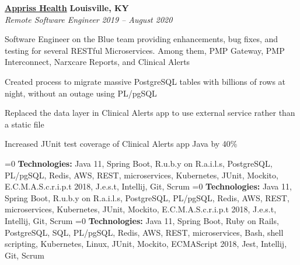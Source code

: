 %
    \headerrow
        {\textbf{\href{https://apprisshealth.com/}{Appriss Health}}}
        {\textbf{Louisville, KY}}
    \\
    \headerrow
        {\emph{Remote Software Engineer}}
        {\emph{2019 -- August 2020}}
    \begin{itemize*}
        \item Software Engineer on the Blue team providing enhancements, bug fixes, and testing for several RESTful Microservices.
            Among them, PMP Gateway, PMP Interconnect, Narxcare Reports, and Clinical Alerts
        \item Created process to migrate massive PostgreSQL tables with billions of rows at night, without an outage using PL/pgSQL
        \item Replaced the data layer in Clinical Alerts app to use external service rather than a static file
        \item Increased JUnit test coverage of Clinical Alerts app Java by 40\%
    \end{itemize*}

    \ifnum{}=0
    \hspace{1.0em}
        {\textbf{Technologies:} Java 11, Spring Boot, R.u.b.y on R.a.i.l.s, PostgreSQL, PL/pgSQL, Redis, AWS,
        REST, microservices, Kubernetes, JUnit, Mockito, E.C.M.A.S.c.r.i.p.t 2018, J.e.s.t, Intellij, Git, Scrum}
    \fi
    \ifnum{}=0
    \hspace{1.0em}
        {\textbf{Technologies:} Java 11, Spring Boot, R.u.b.y on R.a.i.l.s, PostgreSQL, PL/pgSQL, Redis, AWS,
        REST, microservices, Kubernetes, JUnit, Mockito, E.C.M.A.S.c.r.i.p.t 2018, J.e.s.t, Intellij, Git, Scrum}
    \fi
    \ifnum{}=0
    \hspace{1.0em}
        {\textbf{Technologies:} Java 11, Spring Boot, Ruby on Rails, PostgreSQL, SQL, PL/pgSQL, Redis, AWS,
        REST, microservices, Bash, shell scripting, Kubernetes, Linux, JUnit, Mockito, ECMAScript 2018, Jest, Intellij, Git, Scrum}
    \fi



